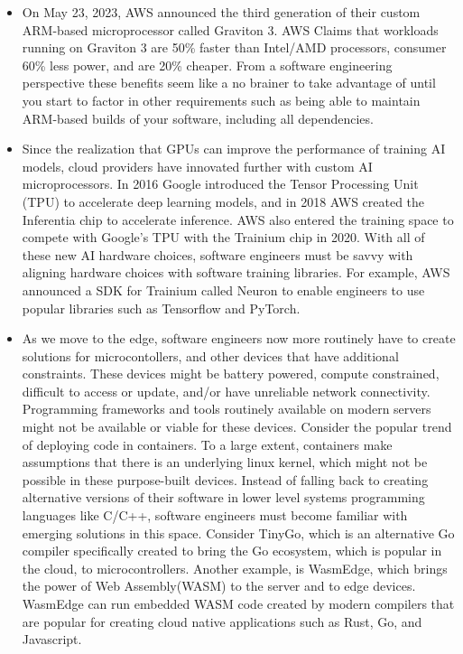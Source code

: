 \documentclass[conference]{IEEEtran}
\begin{document}
\begin{itemize}
	\item On May 23, 2023, AWS announced the third generation of their custom ARM-based microprocessor called Graviton 3.  AWS Claims that workloads running on Graviton 3 are 50\% faster than Intel/AMD processors, consumer 60\% less power, and are 20\% cheaper. From a software engineering perspective these benefits seem like a no brainer to take advantage of until you start to factor in other requirements such as being able to maintain ARM-based builds of your software, including all dependencies. 
		
	\item Since the realization that GPUs can improve the performance of training AI models, cloud providers have innovated further with custom AI microprocessors.  In 2016 Google introduced the Tensor Processing Unit (TPU) to accelerate deep learning models, and in 2018 AWS created the Inferentia chip to accelerate inference. AWS also entered the training space to compete with Google's TPU with the Trainium chip in 2020.  With all of these new AI hardware choices, software engineers must be savvy with aligning hardware choices with software training libraries. For example, AWS announced a SDK for Trainium called Neuron to enable engineers to use popular libraries such as Tensorflow and PyTorch.  
	
	\item As we move to the edge, software engineers now more routinely have to create solutions for microcontollers, and other devices that have additional constraints.  These devices might be battery powered, compute constrained, difficult to access or update, and/or have unreliable network connectivity. Programming frameworks and tools routinely available on modern servers might not be available or viable for these devices.  Consider the popular trend of deploying code in containers.  To a large extent, containers make assumptions that there is an underlying linux kernel, which might not be possible in these purpose-built devices. Instead of falling back to creating alternative versions of their software in lower level systems programming languages like C/C++, software engineers must become familiar with emerging solutions in this space.  Consider TinyGo\cite{TinyGo}, which is an alternative Go compiler specifically created to bring the Go ecosystem, which is popular in the cloud, to microcontrollers.  Another example, is WasmEdge\cite{WASMEdge}, which brings the power of Web Assembly(WASM) to the server and to edge devices.  WasmEdge can run embedded WASM code created by modern compilers that are popular for creating cloud native applications such as Rust, Go, and Javascript.       
	

\end{itemize}
\end{document}
